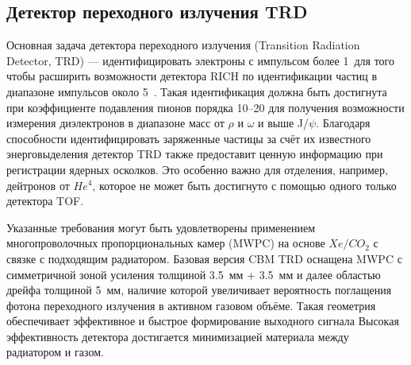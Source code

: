 
\subsection{Детектор переходного излучения TRD}\label{sec:secTRD}

Основная задача детектора переходного излучения (Transition Radiation Detector, TRD) --- идентифицировать электроны с импульсом более 1~\GeVoverC для того чтобы расширить возможности детектора RICH по идентификации частиц в диапазоне импульсов около 5~\GeVoverC.
Такая идентификация должна быть достигнута при коэффициенте подавления пионов порядка 10--20 для получения возможности измерения диэлектронов в диапазоне масс от $\rho$ и $\omega$ и выше J/$\psi$.
Благодаря способности идентифицировать заряженные частицы за счёт их известного энерговыделения детектор TRD также предоставит ценную информацию при регистрации ядерных осколков.
Это особенно важно для отделения, например, дейтронов от $ He^{4} $, которое не может быть достигнуто с помощью одного только детектора TOF.


Указанные требования могут быть удовлетворены применением многопроволочных пропорциональных камер (MWPC) на основе $ Xe/CO_{2} $ с связке с подходящим радиатором. Базовая версия CBM TRD оснащена MWPC с симметричной зоной усиления толщиной 3.5~мм + 3.5~мм и далее областью дрейфа толщиной 5~мм, наличие которой увеличивает вероятность поглащения фотона переходного излучения в активном газовом объёме. Такая геометрия обеспечивает эффективное и быстрое формирование выходного сигнала
Высокая эффективность детектора достигается минимизацией материала между радиатором и газом.


